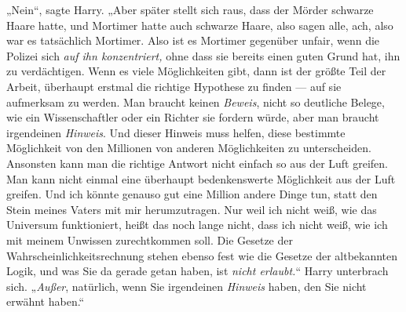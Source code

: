 „Nein“, sagte Harry.
„Aber später stellt sich raus, dass der Mörder schwarze Haare hatte, und Mortimer hatte auch schwarze Haare, also sagen alle, ach, also war es tatsächlich Mortimer. Also ist es Mortimer gegenüber unfair, wenn die Polizei sich \emph{auf ihn konzentriert,} ohne dass sie bereits einen guten Grund hat, ihn zu verdächtigen. Wenn es viele Möglichkeiten gibt, dann ist der größte Teil der Arbeit, überhaupt erstmal die richtige Hypothese zu finden — auf sie aufmerksam zu werden. Man braucht keinen \emph{Beweis}, nicht so deutliche Belege, wie ein Wissenschaftler oder ein Richter sie fordern würde, aber man braucht irgendeinen \emph{Hinweis}. Und dieser Hinweis muss helfen, diese bestimmte Möglichkeit von den Millionen von anderen Möglichkeiten zu unterscheiden. Ansonsten kann man die richtige Antwort nicht einfach so aus der Luft greifen. Man kann nicht einmal eine überhaupt bedenkenswerte Möglichkeit aus der Luft greifen. Und ich könnte genauso gut eine Million andere Dinge tun, statt den Stein meines Vaters mit mir herumzutragen. Nur weil ich nicht weiß, wie das Universum funktioniert, heißt das noch lange nicht, dass ich nicht weiß, wie ich mit meinem Unwissen zurechtkommen soll. Die Gesetze der Wahrscheinlichkeitsrechnung stehen ebenso fest wie die Gesetze der altbekannten Logik, und was Sie da gerade getan haben, ist \emph{nicht erlaubt.}“ Harry unterbrach sich.
„\emph{Außer}, natürlich, wenn Sie irgendeinen \emph{Hinweis} haben, den Sie nicht erwähnt haben.“

